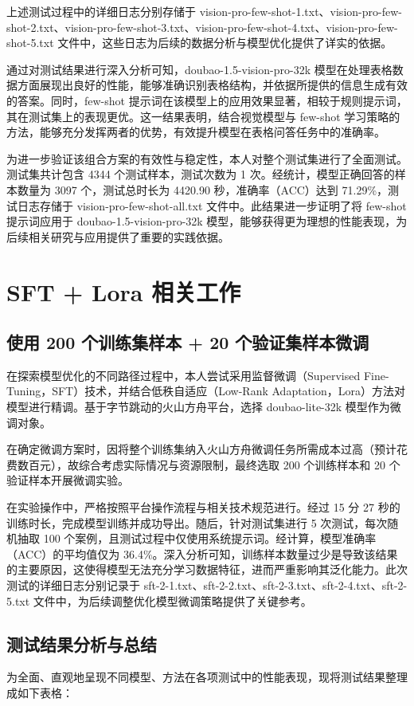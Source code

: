 \documentclass[12pt,a4paper]{ctexart}
\begin{document}
上述测试过程中的详细日志分别存储于 vision-pro-few-shot-1.txt、vision-pro-few-shot-2.txt、vision-pro-few-shot-3.txt、vision-pro-few-shot-4.txt、vision-pro-few-shot-5.txt 文件中，这些日志为后续的数据分析与模型优化提供了详实的依据。

通过对测试结果进行深入分析可知，doubao-1.5-vision-pro-32k 模型在处理表格数据方面展现出良好的性能，能够准确识别表格结构，并依据所提供的信息生成有效的答案。同时，few-shot 提示词在该模型上的应用效果显著，相较于规则提示词，其在测试集上的表现更优。这一结果表明，结合视觉模型与 few-shot 学习策略的方法，能够充分发挥两者的优势，有效提升模型在表格问答任务中的准确率。

为进一步验证该组合方案的有效性与稳定性，本人对整个测试集进行了全面测试。测试集共计包含 4344 个测试样本，测试次数为 1 次。经统计，模型正确回答的样本数量为 3097 个，测试总时长为 4420.90 秒，准确率（ACC）达到 71.29\%，测试日志存储于 vision-pro-few-shot-all.txt 文件中。此结果进一步证明了将 few-shot 提示词应用于 doubao-1.5-vision-pro-32k 模型，能够获得更为理想的性能表现，为后续相关研究与应用提供了重要的实践依据。

\section{SFT + Lora 相关工作}
\subsection{使用 200 个训练集样本 + 20 个验证集样本微调}
在探索模型优化的不同路径过程中，本人尝试采用监督微调（Supervised Fine-Tuning，SFT）技术，并结合低秩自适应（Low-Rank Adaptation，Lora）方法对模型进行精调。基于字节跳动的火山方舟平台，选择 doubao-lite-32k 模型作为微调对象。

在确定微调方案时，因将整个训练集纳入火山方舟微调任务所需成本过高（预计花费数百元），故综合考虑实际情况与资源限制，最终选取 200 个训练样本和 20 个验证样本开展微调实验。

在实验操作中，严格按照平台操作流程与相关技术规范进行。经过 15 分 27 秒的训练时长，完成模型训练并成功导出。随后，针对测试集进行 5 次测试，每次随机抽取 100 个案例，且测试过程中仅使用系统提示词。经计算，模型准确率（ACC）的平均值仅为 36.4\%。深入分析可知，训练样本数量过少是导致该结果的主要原因，这使得模型无法充分学习数据特征，进而严重影响其泛化能力。此次测试的详细日志分别记录于 sft-2-1.txt、sft-2-2.txt、sft-2-3.txt、sft-2-4.txt、sft-2-5.txt 文件中，为后续调整优化模型微调策略提供了关键参考。

\subsection{测试结果分析与总结}
为全面、直观地呈现不同模型、方法在各项测试中的性能表现，现将测试结果整理成如下表格：
\end{document}
